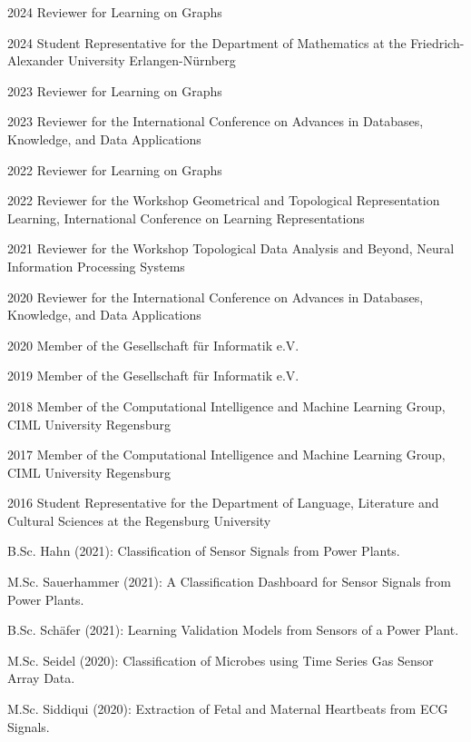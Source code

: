 \documentclass[a4paper, 12pt]{article}
\newcommand{\years}[1]{\marginnote{\scriptsize #1}}
\begin{document}
\years{Service}
\vspace{-10pt}
\begin{etaremune}[itemsep=-5pt, leftmargin=15pt]
	\item[2024] Reviewer for Learning on Graphs
	\item[2024] Student Representative for the Department of Mathematics at the Friedrich-Alexander University Erlangen-Nürnberg
	\item[2023] Reviewer for Learning on Graphs
	\item[2023] Reviewer for the International Conference on Advances in Databases, Knowledge, and Data Applications
	\item[2022] Reviewer for Learning on Graphs
	\item[2022] Reviewer for the Workshop Geometrical and Topological Representation Learning, International Conference on Learning Representations
	\item[2021] Reviewer for the Workshop Topological Data Analysis and Beyond, Neural Information Processing Systems
	\item[2020] Reviewer for the International Conference on Advances in Databases, Knowledge, and Data Applications
	\item[2020] Member of the Gesellschaft für Informatik e.V.
	\item[2019] Member of the Gesellschaft für Informatik e.V.
	\item[2018] Member of the Computational Intelligence and Machine Learning Group, CIML University Regensburg
	\item[2017] Member of the Computational Intelligence and Machine Learning Group, CIML University Regensburg
	\item[2016] Student Representative for the Department of Language, Literature and Cultural Sciences at the Regensburg University
\end{etaremune}
\vspace{10pt}

\years{Supervision}
\vspace{-10pt}
\begin{etaremune}[itemsep=-5pt, leftmargin=15pt]
	\item B.Sc. Hahn (2021): Classification of Sensor Signals from Power Plants.
	\item M.Sc. Sauerhammer (2021): A Classification Dashboard for Sensor Signals from Power Plants.
	\item B.Sc. Schäfer (2021): Learning Validation Models from Sensors of a Power Plant.
	\item M.Sc. Seidel (2020): Classification of Microbes using Time Series Gas Sensor Array Data.
	\item M.Sc. Siddiqui (2020): Extraction of Fetal and Maternal Heartbeats from ECG Signals.
\end{etaremune}
\end{document}
